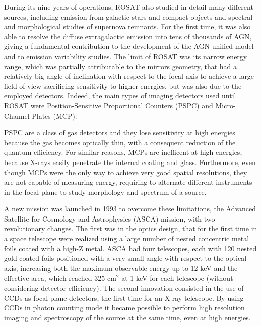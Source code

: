 During its nine years of operations, ROSAT also studied in detail many different sources, including emission from galactic stars and compact objects and spectral and morphological studies of supernova remnants. For the first time, it was also able to resolve the diffuse extragalactic emission into tens of thousands of AGN, giving a fundamental contribution to the development of the AGN unified model and to emission variability studies. The limit of ROSAT was its narrow energy range, which was partially attributable to the mirrors geometry, that had a relatively big angle of inclination with respect to the focal axis to achieve a large field of view sacrificing sensitivity to higher energies, but was also due to the employed detectors. Indeed, the main types of imaging detectors used until ROSAT were Position-Sensitive Proportional Counters (PSPC) and Micro-Channel Plates (MCP).

PSPC are a class of gas detectors and they lose sensitivity at high energies because the gas becomes optically thin, with a consequent reduction of the quantum efficiency. For similar reasons, MCPs are inefficent at high energies, because X-rays easily penetrate the internal coating and glass. Furthermore, even though MCPs were the only way to achieve very good spatial resolutions, they are not capable of measuring energy, requiring to alternate different instruments in the focal plane to study morphology and spectrum of a source.


A new mission was launched in 1993 to overcome these limitations, the Advanced Satellite for Cosmology and Astrophysics (ASCA) mission, with two revolutionary changes. The first was in the optics design, that for the first time in a space telescope were realized using a large number of nested concentric metal foils coated with a high-Z metal. ASCA had four telescopes, each with 120 nested gold-coated foils positioned with a very small angle with respect to the optical axis, increasing both the maximum observable energy up to 12 keV and the effective area, which reached 325 cm$^2$ at 1 keV for each telescope (without considering detector efficiency). The second innovation consisted in the use of CCDs as focal plane detectors, the first time for an X-ray telescope. By using CCDs in photon counting mode it became possible to perform high resolution imaging and spectroscopy of the source at the same time, even at high energies.

